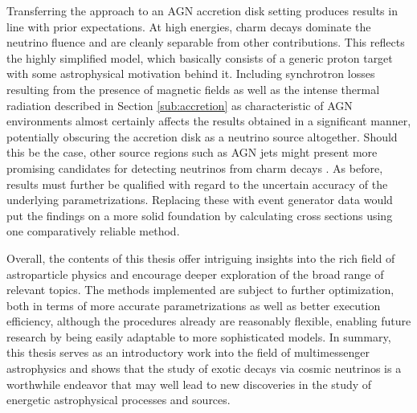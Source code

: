 \begin{spacing}{0.980}
	Transferring the approach to an AGN accretion disk setting produces results in line with prior expectations. At high energies,
	charm decays dominate the neutrino fluence and are cleanly separable from other contributions. This reflects the highly simplified
	model, which basically consists of a generic proton target with some astrophysical motivation behind it. Including synchrotron
	losses resulting from the presence of magnetic fields as well as the intense thermal radiation described in Section \ref{sub:accretion}
	as characteristic of AGN environments almost certainly affects the results obtained in a significant manner, potentially
	obscuring the accretion disk as a neutrino source altogether. Should this be the case, other source regions such as AGN jets
	might present more promising candidates for detecting neutrinos from charm decays \cite{Murase_2023}. As before, results must
	further be qualified with regard to the uncertain accuracy of the underlying parametrizations. Replacing these with event generator
	data would put the findings on a more solid foundation by calculating cross sections using one comparatively reliable method.
	\enlargethispage*{2\baselineskip}\newpage
\end{spacing}

Overall, the contents of this thesis offer intriguing insights into the rich field of astroparticle physics and encourage deeper
exploration of the broad range of relevant topics. The methods implemented are subject to further optimization, both in terms
of more accurate parametrizations as well as better execution efficiency, although the procedures already are reasonably flexible,
enabling future research by being easily adaptable to more sophisticated models. In summary, this thesis serves as an introductory
work into the field of multimessenger astrophysics and shows that the study of exotic decays via cosmic neutrinos is a worthwhile
endeavor that may well lead to new discoveries in the study of energetic astrophysical processes and sources.

